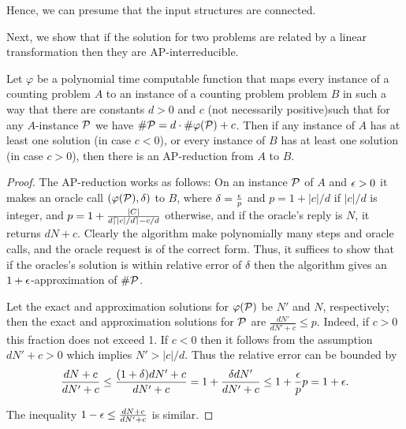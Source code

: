 Hence, we can presume that the input structures are connected.

Next, we show that if the solution for two problems are related by a linear transformation then they
are AP-interreducible. 

\begin{lemma}\label{lemma:linear}
Let \(\varphi\) be a polynomial time computable function that maps every instance of a
counting problem \(A\) to an instance of a counting problem problem \(B\) in such a way that
there are constants \(d > 0\) and \(c\) (not necessarily positive)such that
for any \(A\)-instance \(\mathcal{P}\) we have
\(\#\mathcal{P} = d\cdot \#\varphi(\mathcal{P}) + c\)\@. Then if any instance of \(A\)
has at least one solution 
(in case \(c < 0\)), or every instance of \(B\) has at least one solution (in case \(c>0\)), then
there is an AP-reduction from \(A\) to \(B\)\@.
\end{lemma}
\begin{proof}
The AP-reduction works as follows: On an instance \(\mathcal{P}\) of \(A\) and \(\epsilon > 0\) it makes 
an oracle call \((\varphi(\mathcal{P}),\delta)\) to \(B\), where \(\delta = \frac{\epsilon}{p}\) and 
\(p = 1 + |c|/d\) if \(|c|/d\) is integer, and \(p = 1 + \frac{|C|}{d\lceil|c|/d\rceil-c/d}\) otherwise,
and if the oracle's reply is \(N\), it returns \(dN + c\)\@. Clearly the algorithm make polynomially 
many steps and oracle calls, and the oracle request is of the correct form.
Thus, it suffices to show that if the oracles's solution is within relative error of \(\delta\) then
the algorithm gives an \(1+\epsilon\)-approximation of \(\#\mathcal{P}\)\@.

Let the exact and approximation solutions for \(\varphi(\mathcal{P})\) be \(N'\) and \(N\), respectively;
then the exact and approximation solutions for \(\mathcal{P}\) are \(\frac{dN'}{dN'+c} \le p\)\@.
Indeed, if \(c > 0\) this fraction does not exceed 1\@. If \(c < 0\) then 
it follows from the assumption \(dN' + c > 0\) which implies \(N' > |c|/d\)\@.
Thus the relative error can be bounded by 
\[\frac{dN + c}{dN' + c} \le \frac{(1+\delta)dN' + c}{dN'+c} = 1 + \frac{\delta d N'}{d N' + c} \le 1 + \frac{\epsilon}{p}p = 1 + \epsilon.\]

The inequality \(1-\epsilon \le \frac{dN + c}{dN' + c}\) is similar.
\end{proof}

